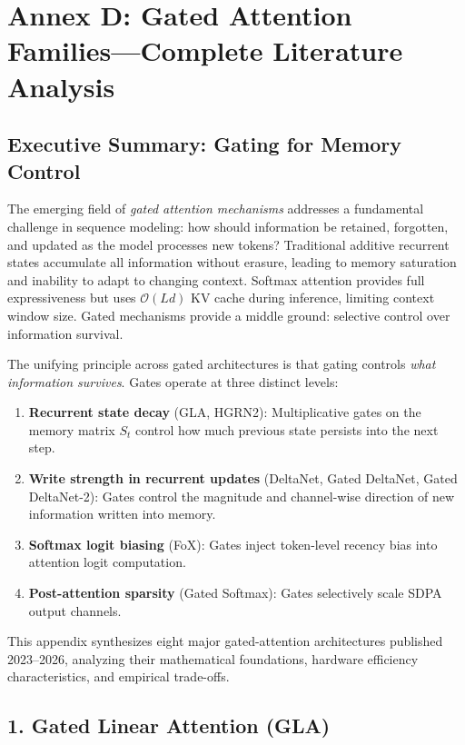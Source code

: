 \section{Annex D: Gated Attention Families---Complete Literature Analysis}
\label{sec:annex-gated}

\subsection{Executive Summary: Gating for Memory Control}

The emerging field of \emph{gated attention mechanisms} addresses a fundamental challenge in sequence modeling: how should information be retained, forgotten, and updated as the model processes new tokens? Traditional additive recurrent states accumulate all information without erasure, leading to memory saturation and inability to adapt to changing context. Softmax attention provides full expressiveness but uses $\mathcal{O}(Ld)$ KV cache during inference, limiting context window size. Gated mechanisms provide a middle ground: selective control over information survival.

The unifying principle across gated architectures is that gating controls \textit{what information survives}. Gates operate at three distinct levels:
\begin{enumerate}[leftmargin=*]
    \item \textbf{Recurrent state decay} (GLA, HGRN2): Multiplicative gates on the memory matrix $S_t$ control how much previous state persists into the next step.
    \item \textbf{Write strength in recurrent updates} (DeltaNet, Gated DeltaNet, Gated DeltaNet-2): Gates control the magnitude and channel-wise direction of new information written into memory.
    \item \textbf{Softmax logit biasing} (FoX): Gates inject token-level recency bias into attention logit computation.
    \item \textbf{Post-attention sparsity} (Gated Softmax): Gates selectively scale SDPA output channels.
\end{enumerate}

This appendix synthesizes eight major gated-attention architectures published 2023--2026, analyzing their mathematical foundations, hardware efficiency characteristics, and empirical trade-offs.

\subsection{1. Gated Linear Attention (GLA)}

